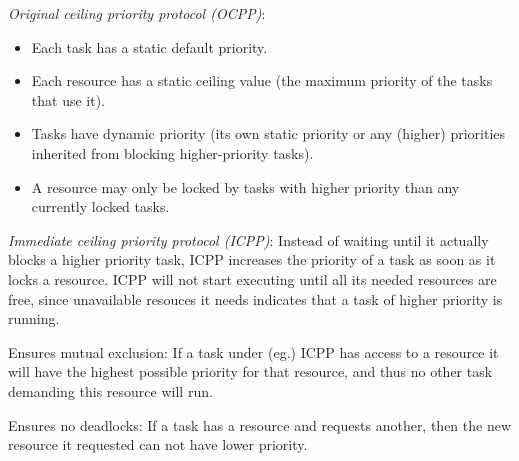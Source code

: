 \textit{Original ceiling priority protocol (OCPP)}:
\begin{itemize}[nolistsep,noitemsep]
  \item Each task has a static default priority.
  \item Each resource has a static ceiling value (the maximum priority of the tasks that use it).
  \item Tasks have dynamic priority (its own static priority or any (higher) priorities inherited from blocking higher-priority tasks).
  \item A resource may only be locked by tasks with higher priority than any currently locked tasks.
\end{itemize}

\textit{Immediate ceiling priority protocol (ICPP)}:
Instead of waiting until it actually blocks a higher priority task, ICPP increases the priority of a task as soon as it locks a resource. ICPP will not start executing until all its needed resources are free, since unavailable resouces it needs indicates that a task of higher priority is running.

Ensures mutual exclusion: If a task under (eg.) ICPP has access to a resource it will have the highest possible priority for that resource, and thus no other task demanding this resource will run.

Ensures no deadlocks: If a task has a resource and requests another, then the new resource it requested can not have lower priority.

